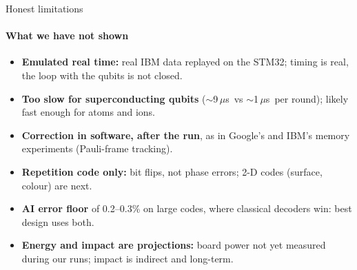 \documentclass[aspectratio=169,11pt]{beamer}
\newcommand{\us}{\,$\mu$s}
\begin{document}
\begin{frame}{Honest limitations}\framesubtitle{What we have not shown}
  \begin{itemize}\setlength\itemsep{0.6em}
    \item \textbf{Emulated real time:} real IBM data replayed on the STM32; timing is real, the loop with the qubits is not closed.
    \item \textbf{Too slow for superconducting qubits} ($\sim$9\us\ vs $\sim$1\us\ per round); likely fast enough for atoms and ions.
    \item \textbf{Correction in software, after the run}, as in Google's and IBM's memory experiments (Pauli-frame tracking).
    \item \textbf{Repetition code only:} bit flips, not phase errors; 2-D codes (surface, colour) are next.
    \item \textbf{AI error floor} of 0.2--0.3\% on large codes, where classical decoders win: best design uses both.
    \item \textbf{Energy and impact are projections:} board power not yet measured during our runs; impact is indirect and long-term.
  \end{itemize}
\end{frame}
\end{document}

